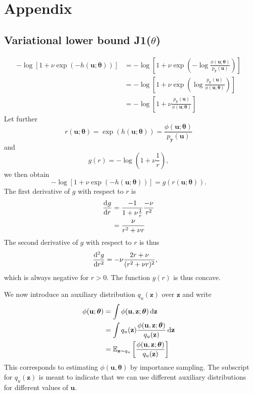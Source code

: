 \documentclass[11pt, oneside]{article}
\newcommand{\thetab}{{\boldsymbol{\theta}}}
\newcommand{\pnn}{\phi}
\newcommand{\pnoise}{p_{ \mathbf y}}
\renewcommand{\u}{{\mathbf u}}
\newcommand{\z}{{\mathbf z}}
\newcommand{\E}{\mathbb{E}}
\begin{document}
\newpage
\section{Appendix}
\subsection{Variational lower bound J1($\theta$)}
\label{sec:appendix derivation of J1}
\label{lower bound}
\begin{align}
  - \log [1+\nu \exp(-h(\u;\thetab))] & =  - \log \left[1+\nu \exp \left(- \log \frac{\pnn(\u;\thetab)}{\pnoise(\u)}\right) \right]\\
  & =  - \log \left[1+\nu \exp \left( \log \frac{\pnoise(\u)}{\pnn(\u;\thetab)}\right) \right]\\
  & =  - \log \left[1+\nu  \frac{\pnoise(\u)}{\pnn(\u;\thetab)} \right] 
\end{align}
Let further
\begin{equation}
  r(\u;\thetab) = \exp(h(\u; \thetab)) = \frac{\pnn(\u;\thetab)}{\pnoise(\u)}
\end{equation}
and
\begin{equation}
  g(r) = -\log \left(1+\nu \frac{1}{r} \right),
\end{equation}
we then obtain
\begin{equation}
  - \log [1+\nu \exp(-h(\u;\thetab))]  = g(r(\u; \thetab)).
\end{equation}
The first derivative of $g$ with respect to $r$ is
\begin{align}
\dod{g}{r} &= \frac{-1}{1+\nu \frac{1}{r}}\frac{-\nu}{r^2}\\
&= \frac{\nu}{r^2+\nu r}
\end{align}
The second derivative of $g$ with respect to $r$ is thus
\begin{align}
\dod[2]{g}{r} &= -\nu \frac{2r +\nu}{(r^2+\nu r)^2},
\end{align}
which is always negative for $r>0$. The function $g(r)$ is thus concave.

We now introduce an auxiliary distribution $q_u(\z)$ over $\z$ and write
\begin{align}
  \pnn(\u; \thetab) &= \int \pnn(\u, \z;\thetab) \dif \z\\
  & = \int q_u(\z) \frac{\pnn(\u,\z; \thetab)}{q_u(\z)} \dif \z\\
  & = \E_{\z \sim q_u} \left[\frac{\pnn(\u,\z; \thetab)}{q_u(\z)}\right]
\end{align}
This corresponds to estimating $\pnn(\u,\thetab)$ by importance sampling. The subscript for $q_u(\z)$ is meant to indicate that we can use different auxiliary distributions for different values of $\u$.
\end{document}
